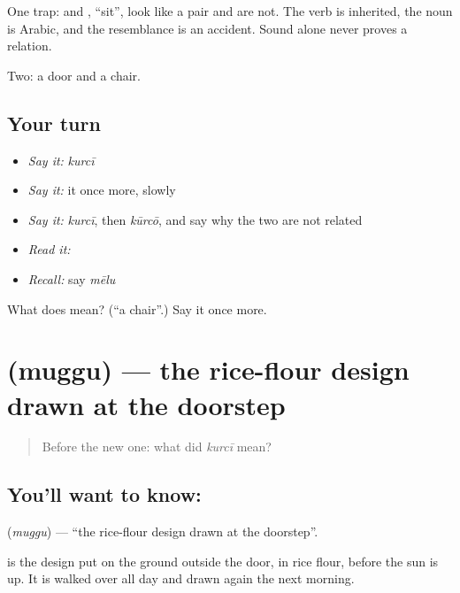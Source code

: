 One trap:  and , \textquotedblleft{}sit\textquotedblright{}, look like a pair and are not. The verb is inherited, the noun is Arabic, and the resemblance is an accident. Sound alone never proves a relation.

\begin{grammarlens}[title={What you've built}]
Two: a door and a chair.
\end{grammarlens}

\subsection*{Your turn}
\begin{itemize}
\raggedright
  \item \emph{Say it:} \emph{kurcī}
  \item \emph{Say it:} it once more, slowly
  \item \emph{Say it:} \emph{kurcī}, then \emph{kūrcō}, and say why the two are not related
  \item \emph{Read it:} \textbf{}
  \item \emph{Recall:} say \emph{mēlu}
\end{itemize}

\begin{tcolorbox}[breakable,colback=teal!4,colframe=teal!35!black,title={Before you move on}]
What does  mean? (\textquotedblleft{}a chair\textquotedblright{}.) Say it once more.
\end{tcolorbox}
\section[\texorpdfstring{\te{ముగ్గు} (muggu)}{ముగ్గు (muggu)}]{ (muggu) — the rice-flour design drawn at the doorstep}

\label{lesson:TE-C52-muggu}



\begin{quote}
Before the new one: what did \emph{kurcī} mean?
\end{quote}

\subsection*{You'll want to know: }
\textbf{} (\emph{muggu}) — \textquotedblleft{}the rice-flour design drawn at the doorstep\textquotedblright{}.

 is the design put on the ground outside the door, in rice flour, before the sun is up. It is walked over all day and drawn again the next morning.

